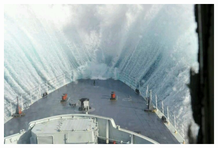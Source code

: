 \section{\thesec}
\label{sec:background_and_motivation}

\begin{frame}{\thesec}{\thesubsec}
  \vspace*{-3\baselineskip}
  \begin{columns}
    \begin{column}{\paperwidth}
      \begin{figure}
        \centering
        
        \label{fig:marine_icing_process}
      \end{figure}
    \end{column}
  \end{columns}
\end{frame}

\begin{frame}{\thesec}{\thesubsec}
  \vspace*{-0.5\baselineskip}
  \begin{columns}
    \begin{column}{\paperwidth}
      \begin{figure}
        \centering
        \includegraphics[width=\paperwidth]{img/wave_spray.jpg}
        \label{fig:wave_spray}
      \end{figure}
    \end{column}
  \end{columns}
\end{frame}

